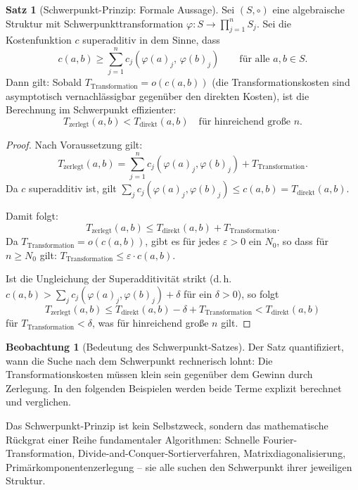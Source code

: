 ﻿\documentclass[a4paper,12pt]{report}
\theoremstyle{definition}
\newtheorem{satz}{Satz}
\newtheorem{beobachtung}{Beobachtung}
\begin{document}
\begin{satz}[Schwerpunkt-Prinzip: Formale Aussage]
    \label{satz:schwerpunkt}
    Sei $(S, \circ)$ eine algebraische Struktur mit Schwerpunkttransformation
    $\varphi : S \to \prod_{j=1}^n S_j$.
    Sei die Kostenfunktion $c$ superadditiv in dem Sinne, dass
    \[
        c(a, b) \geq \sum_{j=1}^n c_j(\varphi(a)_j,\, \varphi(b)_j)
        \qquad \text{für alle } a, b \in S.
    \]
    Dann gilt: Sobald $T_{\mathrm{Transformation}} = o(c(a,b))$
    (die Transformationskosten sind asymptotisch vernachlässigbar
    gegenüber den direkten Kosten), ist die Berechnung im
    Schwerpunkt effizienter:
    \[
        T_{\mathrm{zerlegt}}(a, b) < T_{\mathrm{direkt}}(a, b)
        \quad \text{für hinreichend große } n.
    \]
\end{satz}

\begin{proof}
    Nach Voraussetzung gilt:
    \[
        T_{\mathrm{zerlegt}}(a,b)
        = \sum_{j=1}^n c_j(\varphi(a)_j, \varphi(b)_j)
        + T_{\mathrm{Transformation}}.
    \]
    Da $c$ superadditiv ist, gilt
    $\sum_{j} c_j(\varphi(a)_j, \varphi(b)_j) \leq c(a,b)
    = T_{\mathrm{direkt}}(a,b)$.

    Damit folgt:
    \[
        T_{\mathrm{zerlegt}}(a,b)
        \leq T_{\mathrm{direkt}}(a,b) + T_{\mathrm{Transformation}}.
    \]
    Da $T_{\mathrm{Transformation}} = o(c(a,b))$, gibt es für jedes
    $\varepsilon > 0$ ein $N_0$, so dass für $n \geq N_0$ gilt:
    $T_{\mathrm{Transformation}} \leq \varepsilon \cdot c(a,b)$.

    Ist die Ungleichung der Superadditivität strikt
    (d.\,h.\ $c(a,b) > \sum_j c_j(\varphi(a)_j, \varphi(b)_j) + \delta$
    für ein $\delta > 0$), so folgt
    \[
        T_{\mathrm{zerlegt}}(a,b)
        \leq T_{\mathrm{direkt}}(a,b) - \delta
        + T_{\mathrm{Transformation}}
        < T_{\mathrm{direkt}}(a,b)
    \]
    für $T_{\mathrm{Transformation}} < \delta$,
    was für hinreichend große $n$ gilt.
\end{proof}

\begin{beobachtung}[Bedeutung des Schwerpunkt-Satzes]
    Der Satz quantifiziert, wann die Suche nach dem Schwerpunkt
    rechnerisch lohnt: Die Transformationskosten müssen klein sein
    gegenüber dem Gewinn durch Zerlegung. In den folgenden Beispielen
    werden beide Terme explizit berechnet und verglichen.

    Das Schwerpunkt-Prinzip ist kein Selbstzweck, sondern das
    mathematische Rückgrat einer Reihe fundamentaler Algorithmen:
    Schnelle Fourier-Transformation, Divide-and-Conquer-Sortierverfahren,
    Matrixdiagonalisierung, Primärkomponentenzerlegung -- sie alle
    suchen den Schwerpunkt ihrer jeweiligen Struktur.
\end{beobachtung}
\end{document}

